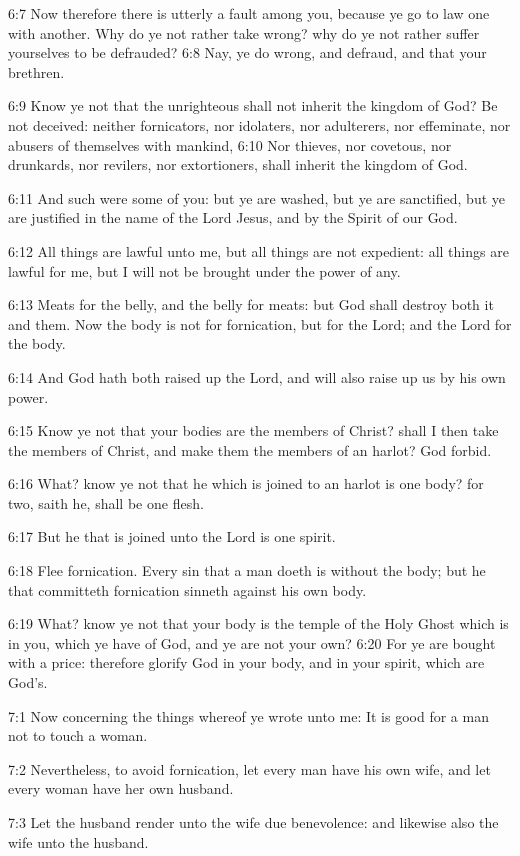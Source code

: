 6:7 Now therefore there is utterly a fault among you, because ye go to law one with another. Why do ye not rather take wrong? why do ye not rather suffer yourselves to be defrauded?  6:8 Nay, ye do wrong, and defraud, and that your brethren.

6:9 Know ye not that the unrighteous shall not inherit the kingdom of God?  Be not deceived: neither fornicators, nor idolaters, nor adulterers, nor effeminate, nor abusers of themselves with mankind, 6:10 Nor thieves, nor covetous, nor drunkards, nor revilers, nor extortioners, shall inherit the kingdom of God.

6:11 And such were some of you: but ye are washed, but ye are sanctified, but ye are justified in the name of the Lord Jesus, and by the Spirit of our God.

6:12 All things are lawful unto me, but all things are not expedient: all things are lawful for me, but I will not be brought under the power of any.

6:13 Meats for the belly, and the belly for meats: but God shall destroy both it and them. Now the body is not for fornication, but for the Lord; and the Lord for the body.

6:14 And God hath both raised up the Lord, and will also raise up us by his own power.

6:15 Know ye not that your bodies are the members of Christ? shall I then take the members of Christ, and make them the members of an harlot? God forbid.

6:16 What? know ye not that he which is joined to an harlot is one body?  for two, saith he, shall be one flesh.

6:17 But he that is joined unto the Lord is one spirit.

6:18 Flee fornication. Every sin that a man doeth is without the body; but he that committeth fornication sinneth against his own body.

6:19 What? know ye not that your body is the temple of the Holy Ghost which is in you, which ye have of God, and ye are not your own?  6:20 For ye are bought with a price: therefore glorify God in your body, and in your spirit, which are God's.

7:1 Now concerning the things whereof ye wrote unto me: It is good for a man not to touch a woman.

7:2 Nevertheless, to avoid fornication, let every man have his own wife, and let every woman have her own husband.

7:3 Let the husband render unto the wife due benevolence: and likewise also the wife unto the husband.

